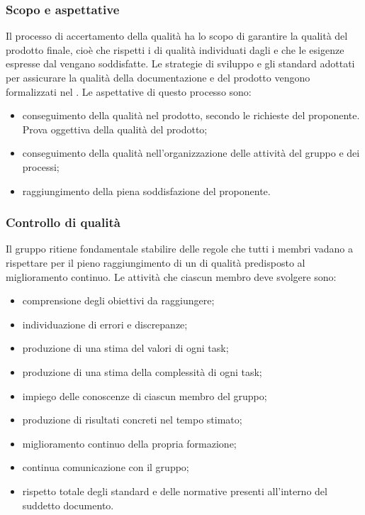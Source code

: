 {{\subsubsection{Scopo e aspettative}
Il processo di accertamento della qualità ha lo scopo di garantire la qualità del prodotto finale, cioè che rispetti i  di qualità individuati dagli  e che le esigenze espresse dal  vengano soddisfatte. Le strategie di sviluppo e gli standard adottati per assicurare la qualità della documentazione e del prodotto vengono formalizzati nel \PdQ{}. Le aspettative di questo processo sono:
\begin{itemize}
	\item conseguimento della qualità nel prodotto, secondo le richieste del proponente. \\
		Prova oggettiva della qualità del prodotto;
	\item conseguimento della qualità nell'organizzazione delle attività del gruppo e dei processi;
	\item raggiungimento della piena soddisfazione del proponente.
\end{itemize}
\subsubsection{Controllo di qualità}
Il gruppo \textit{\Gruppo{}} ritiene fondamentale stabilire delle regole che tutti i membri vadano a rispettare per il pieno raggiungimento di un  di qualità predisposto al miglioramento continuo.
Le attività che ciascun membro deve svolgere sono:
\begin{itemize}
	\item comprensione degli obiettivi da raggiungere;
	\item individuazione di errori e discrepanze;
	\item produzione di una stima del valori di ogni task;
	\item produzione di una stima della complessità di ogni task;
	\item impiego delle conoscenze di ciascun membro del gruppo;
	\item produzione di risultati concreti nel tempo stimato;
	\item miglioramento continuo della propria formazione;
	\item continua comunicazione con il gruppo;
	\item rispetto totale degli standard e delle normative presenti all'interno del suddetto documento.
\end{itemize} 
}}
